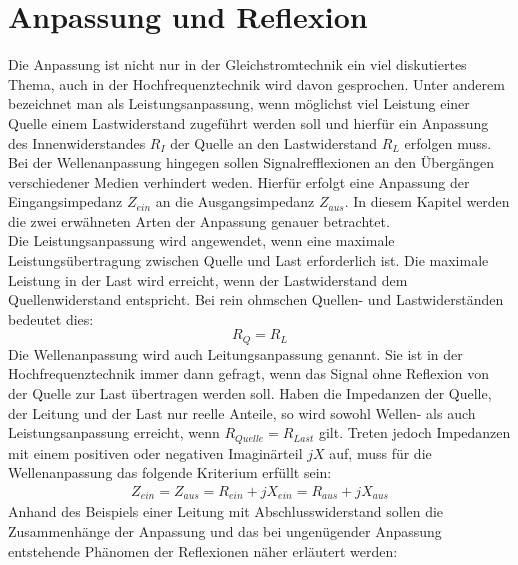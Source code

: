 \section{Anpassung und Reflexion}\label{sec:AnpassungReflexionen}
Die Anpassung ist nicht nur in der Gleichstromtechnik ein viel diskutiertes Thema, auch in der Hochfrequenztechnik wird davon gesprochen. Unter anderem bezeichnet man als Leistungsanpassung, wenn möglichst viel Leistung einer Quelle einem Lastwiderstand zugeführt werden soll und hierfür ein Anpassung des Innenwiderstandes $R_I$ der Quelle an den Lastwiderstand $R_L$ erfolgen muss. Bei der  Wellenanpassung hingegen sollen Signalrefflexionen an den Übergängen verschiedener Medien verhindert weden. Hierfür erfolgt eine Anpassung der Eingangsimpedanz $Z_{ein}$ an die Ausgangsimpedanz $Z_{aus}$. 
In diesem Kapitel werden die zwei erwähneten Arten der Anpassung genauer betrachtet.\\


Die Leistungsanpassung wird angewendet, wenn eine maximale Leistungsübertragung zwischen Quelle und Last erforderlich ist. Die maximale Leistung in der Last wird erreicht, wenn der Lastwiderstand dem Quellenwiderstand entspricht. Bei rein ohmschen Quellen- und Lastwiderständen bedeutet dies:\\
\[R_{Q} = R_{L}\]
Die Wellenanpassung wird auch Leitungsanpassung genannt. Sie ist in der Hochfrequenztechnik immer dann gefragt, wenn das Signal ohne Reflexion von der Quelle zur Last übertragen werden soll. Haben die Impedanzen der Quelle, der Leitung und der Last nur reelle Anteile, so wird sowohl Wellen- als auch Leistungsanpassung erreicht, wenn $R_{Quelle} = R_{Last}$ gilt. Treten jedoch Impedanzen mit einem positiven oder negativen Imaginärteil $jX$ auf, muss für die Wellenanpassung das folgende Kriterium erfüllt sein:
\begin{eqnarray}\label{eq:ZeinZaus}
Z_{ein} = Z_{aus} = R_{ein} +jX_{ein} = R_{aus} + jX_{aus}
\end{eqnarray}
Anhand des Beispiels einer Leitung mit Abschlusswiderstand sollen die Zusammenhänge der Anpassung und das bei ungenügender Anpassung  entstehende Phänomen der Reflexionen näher erläutert werden: \\

